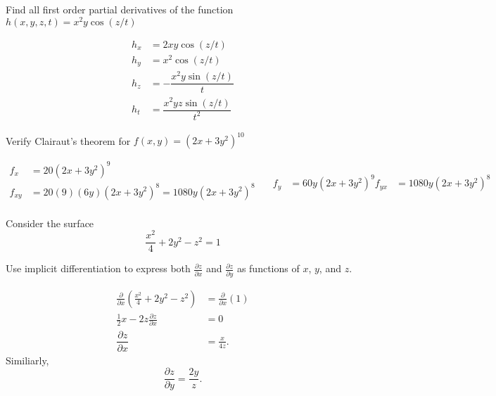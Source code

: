 \documentclass[12pt]{exam}
\newcommand{\pd}[2]{\dfrac{\partial #1}{\partial #2}}
\begin{document}
\begin{questions}
\begin{parts}
        \end{parts}

    \question Find all first order partial derivatives of the function \(h(x,y,z,t)=x^2y\cos(z/t)\)
            \ifprintanswers
                \begin{solution}
                    \begin{align*}
                        h_{x} & = 2xy\cos(z/t)\\
                        h_{y} & = x^2\cos(z/t)\\
                        h_{z} & = -\dfrac{x^2y\sin(z/t)}{t}\\
                        h_{t} & = \dfrac{x^2yz\sin(z/t)}{t^2}
                    \end{align*}
                \end{solution}
            \else
                \vfill
            \fi

\newpage

    \question Verify Clairaut's theorem for \(f(x,y)=(2x+3y^2)^{10}\)
        \ifprintanswers
                \begin{solution}
                    \begin{equation}
                        \begin{aligned}
                            f_{x}&=20(2x+3y^2)^9\\
                            f_{xy}&=20(9)(6y)(2x+3y^2)^8 = 1080y(2x+3y^2)^8\\
                        \end{aligned}
                        \quad 
                        \begin{aligned}
                            f_{y}&=60y(2x+3y^2)^9
                            f_{yx}&=1080y(2x+3y^2)^8
                        \end{aligned}
                    \end{equation}
                \end{solution}
            \else
                \vfill
            \fi

    \question Consider the surface 
    \[
        \frac{x^2}{4}+2y^2-z^2=1
    \]

    Use implicit differentiation to express both \(\frac{\partial z}{\partial x}\) and \(\frac{\partial z}{\partial y}\) as functions of \(x\), \(y\), and \(z\).
    \ifprintanswers
                \begin{solution}
                    \begin{align*}
                        \frac{\partial}{\partial x}\left(\frac{x^2}{4}+2y^2-z^2\right) &= \frac{\partial}{\partial x}(1)\\
                        \frac{1}{2}x-2z\frac{\partial z}{\partial x}&=0\\
                        \pd{z}{x} & = \frac{x}{4z}.
                    \end{align*}
                    Similiarly,
                        \[
                            \pd{z}{y} = \frac{2y}{z}.
                        \]
                \end{solution}
            \else
                \vfill
            \fi

\end{questions}
\end{document}
